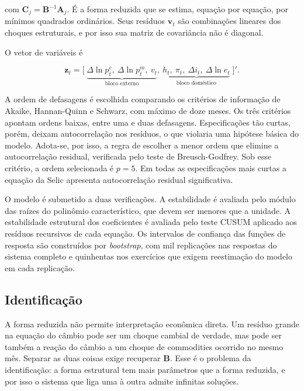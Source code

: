 \documentclass[12pt,openright,oneside,a4paper,portuguese,brazil]{abntex2}
\begin{document}
\noindent com $\mathbf{C}_j = \mathbf{B}^{-1}\mathbf{A}_j$. É a forma reduzida
que se estima, equação por equação, por mínimos quadrados ordinários. Seus
resíduos $\mathbf{v}_t$ são combinações lineares dos choques estruturais, e por
isso sua matriz de covariância não é diagonal.

O vetor de variáveis é

\begin{equation}
\mathbf{z}_t = \big[\; \underbrace{\Delta\ln p^{c}_t,\ \Delta\ln p^{m}_t,\ v_t}_{\text{bloco externo}},\
\underbrace{h_t,\ \pi_t,\ \Delta i_t,\ \Delta\ln e_t}_{\text{bloco doméstico}} \;\big]'.
\label{eq:vetor}
\end{equation}

A ordem de defasagens é escolhida comparando os critérios de informação de
Akaike, Hannan-Quinn e Schwarz, com máximo de doze meses. Os três critérios
apontam ordens baixas, entre uma e duas defasagens. Especificações tão curtas,
porém, deixam autocorrelação nos resíduos, o que violaria uma hipótese básica
do modelo. Adota-se, por isso, a regra de escolher a menor ordem que elimine a
autocorrelação residual, verificada pelo teste de Breusch-Godfrey. Sob esse
critério, a ordem selecionada é $p = 5$. Em todas as especificações mais curtas
a equação da Selic apresenta autocorrelação residual significativa.

O modelo é submetido a duas verificações. A estabilidade é avaliada pelo módulo
das raízes do polinômio característico, que devem ser menores que a unidade. A
estabilidade estrutural dos coeficientes é avaliada pelo teste CUSUM aplicado
aos resíduos recursivos de cada equação. Os intervalos de confiança das funções
de resposta são construídos por \textit{bootstrap}, com mil replicações nas
respostas do sistema completo e quinhentas nos exercícios que exigem reestimação
do modelo em cada replicação.

\subsection{Identificação}

A forma reduzida não permite interpretação econômica direta. Um resíduo grande
na equação do câmbio pode ser um choque cambial de verdade, mas pode ser também
a reação do câmbio a um choque de commodities ocorrido no mesmo mês. Separar as
duas coisas exige recuperar $\mathbf{B}$. Esse é o problema da identificação: a
forma estrutural tem mais parâmetros que a forma reduzida, e por isso o sistema
que liga uma à outra admite infinitas soluções.
\end{document}

